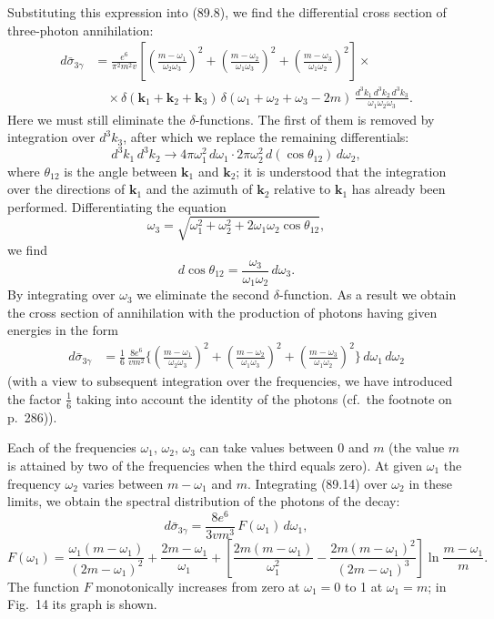 Substituting this expression into (89.8), we find the differential cross section of three-photon annihilation:
\begin{equation}
\begin{split}
d\bar{\sigma}_{3\gamma} &= \frac{e^6}{\pi^2 m^2 v}\left[\left(\frac{m-\omega_1}{\omega_2\omega_3}\right)^{\!2} + \left(\frac{m-\omega_2}{\omega_1\omega_3}\right)^{\!2} + \left(\frac{m-\omega_3}{\omega_1\omega_2}\right)^{\!2}\right] \times {} \\
&\quad \times \delta(\mathbf{k}_1 + \mathbf{k}_2 + \mathbf{k}_3)\,\delta(\omega_1 + \omega_2 + \omega_3 - 2m)\,\frac{d^3k_1\,d^3k_2\,d^3k_3}{\omega_1\omega_2\omega_3}.
\end{split}
\label{eq:89.13}
\end{equation}
Here we must still eliminate the $\delta$-functions. The first of them is removed by integration over $d^3k_3$, after which we replace the remaining differentials:
\[
d^3k_1\,d^3k_2 \to 4\pi\omega_1^2\,d\omega_1 \cdot 2\pi\omega_2^2\,d(\cos\theta_{12})\,d\omega_2,
\]
where $\theta_{12}$ is the angle between $\mathbf{k}_1$ and $\mathbf{k}_2$; it is understood that the integration over the directions of $\mathbf{k}_1$ and the azimuth of $\mathbf{k}_2$ relative to $\mathbf{k}_1$ has already been performed. Differentiating the equation
\[
\omega_3 = \sqrt{\omega_1^2 + \omega_2^2 + 2\omega_1\omega_2\cos\theta_{12}},
\]
we find
\[
d\cos\theta_{12} = \frac{\omega_3}{\omega_1\omega_2}\,d\omega_3.
\]
By integrating over $\omega_3$ we eliminate the second $\delta$-function. As a result we obtain the cross section of annihilation with the production of photons having given energies in the form
\begin{equation}
\begin{split}
d\bar{\sigma}_{3\gamma} &= \frac{1}{6}\,\frac{8e^6}{vm^2}\biggl\{\!\left(\frac{m-\omega_1}{\omega_2\omega_3}\right)^{\!2} + \left(\frac{m-\omega_2}{\omega_1\omega_3}\right)^{\!2} + \left(\frac{m-\omega_3}{\omega_1\omega_2}\right)^{\!2}\!\biggr\}\,d\omega_1\,d\omega_2
\end{split}
\label{eq:89.14}
\end{equation}
(with a view to subsequent integration over the frequencies, we have introduced the factor $\frac{1}{6}$ taking into account the identity of the photons (cf.\ the footnote on p.~286)).

Each of the frequencies $\omega_1$, $\omega_2$, $\omega_3$ can take values between 0 and $m$ (the value $m$ is attained by two of the frequencies when the third equals zero). At given $\omega_1$ the frequency $\omega_2$ varies between $m - \omega_1$ and $m$. Integrating (89.14) over $\omega_2$ in these limits, we obtain the spectral distribution of the photons of the decay:
\[
d\bar{\sigma}_{3\gamma} = \frac{8e^6}{3vm^3}\,F(\omega_1)\,d\omega_1,
\]
\[
F(\omega_1) = \frac{\omega_1(m-\omega_1)}{(2m-\omega_1)^2} + \frac{2m-\omega_1}{\omega_1} + \left[\frac{2m(m-\omega_1)}{\omega_1^2} - \frac{2m(m-\omega_1)^2}{(2m-\omega_1)^3}\right]\ln\frac{m-\omega_1}{m}.
\]
The function $F$ monotonically increases from zero at $\omega_1 = 0$ to 1 at $\omega_1 = m$; in Fig.~14 its graph is shown.

